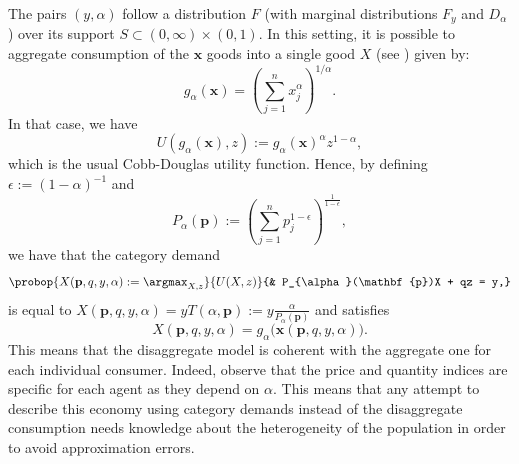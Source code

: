 \documentclass[english, a4paper,12pt]{article}
\begin{document}
The pairs $(y,\alpha)$ follow a distribution $F$ (with marginal distributions $F_{y}$ and $D_{\alpha}$) over its support $S \subset (0,\infty) \times  (0,1)$. In this setting, it is possible to aggregate consumption of the $\mathbf{x}$ goods into a single good $X$ (see ) given by: 
	\begin{equation} \label{eq:qtyindex}
		g_{\alpha}(\mathbf{x}) = \left(\sum_{j=1}^{n} x_{j}^{\alpha}\right)^{1/\alpha}.
	\end{equation}
In that case, we have
	\begin{equation} \label{eq:utilagg}
		U(g_{\alpha}(\mathbf{x}), z) := g_{\alpha}(\mathbf{x})^{\alpha}z^{1-\alpha},
	\end{equation}
which is the usual Cobb-Douglas utility function. Hence, by defining $\epsilon := (1-\alpha)^{-1}$ and
	\begin{equation} \label{eq:priceindex}
		P_{\alpha}(\mathbf{p}) :=  \left( \sum_{j=1}^{n} p_{j}^{1-\epsilon} \right)^{\frac{1}{1-\epsilon}},
	\end{equation}
we have that the category demand
	\begin{equation} \label{eq:probagg}
		\probop{X(\mathbf{p}, q, y, \alpha) := \argmax_{X, z}}{U(X,z)}
										{&	P_{\alpha}(\mathbf{p})X + qz = y,}
	\end{equation}
is equal to $X(\mathbf{p}, q,y,\alpha) = yT(\alpha, \mathbf{p}) := y \frac{\alpha}{P_{\alpha}(\mathbf{p})}$ and satisfies 
	\begin{equation} \label{eq:aggequality}
		X(\mathbf{p}, q, y, \alpha) = g_{\alpha}\big(\mathbf{x}(\mathbf{p}, q, y, \alpha)\big).
	\end{equation}
This means that the disaggregate model is coherent with the aggregate one for each individual consumer. Indeed, observe that the price and quantity indices are specific for each agent as they depend on $\alpha$. This means that any attempt to describe this economy using category demands instead of the disaggregate consumption needs knowledge about the heterogeneity of the population in order to avoid approximation errors.

\end{document}
